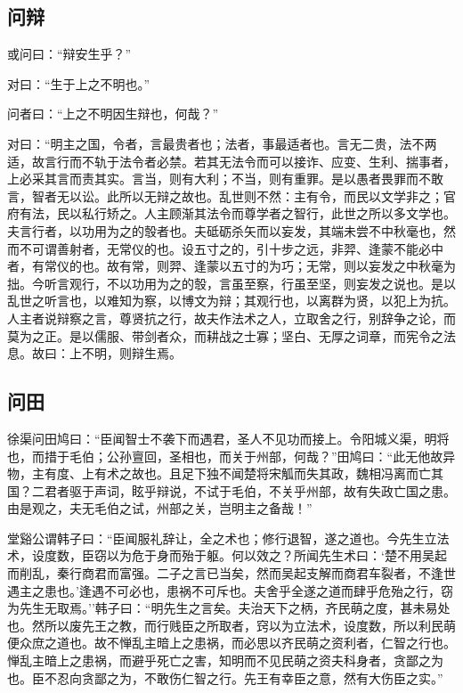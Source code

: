\documentclass[]{article}
\begin{document}
\hypertarget{header-n1584}{%
\subsection{问辩}\label{header-n1584}}

或问曰：``辩安生乎？''

对曰：``生于上之不明也。''

问者曰：``上之不明因生辩也，何哉？''

对曰：``明主之国，令者，言最贵者也；法者，事最适者也。言无二贵，法不两适，故言行而不轨于法令者必禁。若其无法令而可以接诈、应变、生利、揣事者，上必采其言而责其实。言当，则有大利；不当，则有重罪。是以愚者畏罪而不敢言，智者无以讼。此所以无辩之故也。乱世则不然：主有令，而民以文学非之；官府有法，民以私行矫之。人主顾渐其法令而尊学者之智行，此世之所以多文学也。夫言行者，以功用为之的彀者也。夫砥砺杀矢而以妄发，其端未尝不中秋毫也，然而不可谓善射者，无常仪的也。设五寸之的，引十步之远，非羿、逢蒙不能必中者，有常仪的也。故有常，则羿、逢蒙以五寸的为巧；无常，则以妄发之中秋毫为拙。今听言观行，不以功用为之的彀，言虽至察，行虽至坚，则妄发之说也。是以乱世之听言也，以难知为察，以博文为辩；其观行也，以离群为贤，以犯上为抗。人主者说辩察之言，尊贤抗之行，故夫作法术之人，立取舍之行，别辞争之论，而莫为之正。是以儒服、带剑者众，而耕战之士寡；坚白、无厚之词章，而宪令之法息。故曰：上不明，则辩生焉。

\hypertarget{header-n1585}{%
\subsection{问田}\label{header-n1585}}

徐渠问田鸠曰：``臣闻智士不袭下而遇君，圣人不见功而接上。令阳城义渠，明将也，而措于毛伯；公孙亶回，圣相也，而关于州部，何哉？''田鸠曰：``此无他故异物，主有度、上有术之故也。且足下独不闻楚将宋觚而失其政，魏相冯离而亡其国？二君者驱于声词，眩乎辩说，不试于毛伯，不关乎州部，故有失政亡国之患。由是观之，夫无毛伯之试，州部之关，岂明主之备哉！''

堂谿公谓韩子曰：``臣闻服礼辞让，全之术也；修行退智，遂之道也。今先生立法术，设度数，臣窃以为危于身而殆于躯。何以效之？所闻先生术曰：`楚不用吴起而削乱，秦行商君而富强。二子之言已当矣，然而吴起支解而商君车裂者，不逢世遇主之患也。'逢遇不可必也，患祸不可斥也。夫舍乎全遂之道而肆乎危殆之行，窃为先生无取焉。''韩子曰：``明先生之言矣。夫治天下之柄，齐民萌之度，甚未易处也。然所以废先王之教，而行贱臣之所取者，窍以为立法术，设度数，所以利民萌便众庶之道也。故不惮乱主暗上之患祸，而必思以齐民萌之资利者，仁智之行也。惮乱主暗上之患祸，而避乎死亡之害，知明而不见民萌之资夫科身者，贪鄙之为也。臣不忍向贪鄙之为，不敢伤仁智之行。先王有幸臣之意，然有大伤臣之实。''
\end{document}
